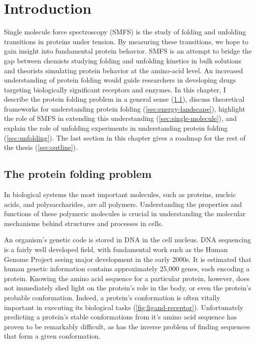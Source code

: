 \chapter{Introduction}
\label{sec:intro}

Single molecule force spectroscopy (SMFS) is the study of folding and
unfolding transitions in proteins under tension.  By measuring these
transitions, we hope to gain insight into fundamental protein
behavior.  SMFS is an attempt to bridge the gap between chemists
studying folding and unfolding kinetics in bulk solutions and
theorists simulating protein behavior at the amino-acid level.  An
increased understanding of protein folding would guide researchers in
developing drugs targeting biologically significant receptors and
enzymes.  In this chapter, I describe the protein folding problem in a
general sense (\cref{sec:folding-problem}), discuss theoretical
frameworks for understanding protein folding
(\cref{sec:energy-landscape}), highlight the role of SMFS in extending
this understanding (\cref{sec:single-molecule}), and explain the role
of unfolding experiments in understanding protein folding
(\cref{sec:unfolding}).  The last section in this chapter gives a
roadmap for the rest of the thesis (\cref{sec:outline}).

\section{The protein folding problem}
\label{sec:folding-problem}

In biological systems the most important molecules, such as proteins,
nucleic acids, and polysaccharides, are all polymers.  Understanding
the properties and functions of these polymeric molecules is crucial
in understanding the molecular mechanisms behind structures and
processes in cells.

An organism's genetic code is stored in DNA in the cell nucleus.
DNA sequencing is a fairly well developed field, with fundamental work
such as the Human Genome Project seeing major development in the early
2000s\citep{wolfsberg01,mcpherson01,collins03}.  It is estimated that
human genetic information contains approximately 25,000 genes, each
encoding a protein\citep{claverie01,venter01}.  Knowing the amino acid
sequence for a particular protein, however, does not immediately shed
light on the protein's role in the body, or even the protein's
probable conformation.  Indeed, a protein's conformation is often
vitally important in executing its biological tasks
(\cref{fig:ligand-receptor}).  Unfortunately predicting a protein's
stable conformations from it's amino acid sequence has proven to be
remarkably difficult, as has the inverse problem of finding sequences
that form a given conformation.
%

